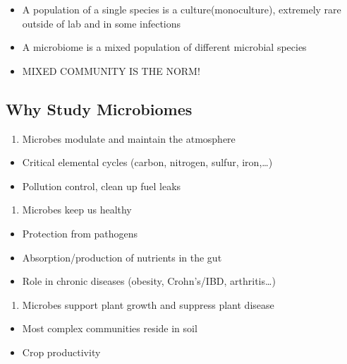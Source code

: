 \documentclass[
]{book}
\providecommand{\tightlist}{%
  \setlength{\itemsep}{0pt}\setlength{\parskip}{0pt}}
\begin{document}
\begin{itemize}
\tightlist
\item
  A population of a single species is a culture(monoculture), extremely rare outside of lab and in some infections
\item
  A microbiome is a mixed population of different microbial species
\item
  MIXED COMMUNITY IS THE NORM!
\end{itemize}

\hypertarget{why-study-microbiomes}{%
\subsection{Why Study Microbiomes}\label{why-study-microbiomes}}

\begin{enumerate}
\def\labelenumi{\arabic{enumi}.}
\tightlist
\item
  Microbes modulate and maintain the atmosphere
\end{enumerate}

\begin{itemize}
\tightlist
\item
  Critical elemental cycles (carbon, nitrogen, sulfur, iron,\ldots)
\item
  Pollution control, clean up fuel leaks
\end{itemize}

\begin{enumerate}
\def\labelenumi{\arabic{enumi}.}
\setcounter{enumi}{1}
\tightlist
\item
  Microbes keep us healthy
\end{enumerate}

\begin{itemize}
\tightlist
\item
  Protection from pathogens
\item
  Absorption/production of nutrients in the gut
\item
  Role in chronic diseases (obesity, Crohn's/IBD, arthritis\ldots)
\end{itemize}

\begin{enumerate}
\def\labelenumi{\arabic{enumi}.}
\setcounter{enumi}{2}
\tightlist
\item
  Microbes support plant growth and suppress plant disease
\end{enumerate}

\begin{itemize}
\tightlist
\item
  Most complex communities reside in soil
\item
  Crop productivity
\end{itemize}
\end{document}
